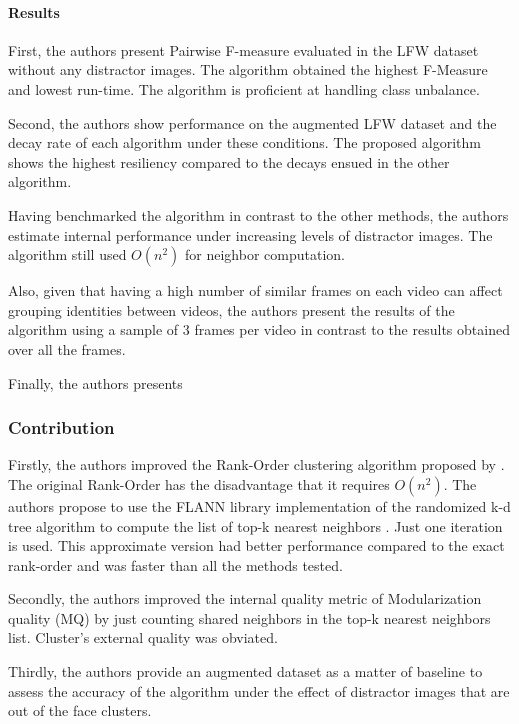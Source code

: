 \documentclass[17pt,]{extarticle}
\let\oldparagraph\paragraph
\renewcommand{\paragraph}[1]{\oldparagraph{#1}\mbox{}}
\begin{document}
\normalsize

\hypertarget{results}{%
\paragraph{Results}\label{results}}

First, the authors present Pairwise F-measure evaluated in the LFW dataset without any distractor images. The algorithm obtained the highest F-Measure and lowest run-time. The algorithm is proficient at handling class unbalance.

Second, the authors show performance on the augmented LFW dataset and the decay rate of each algorithm under these conditions. The proposed algorithm shows the highest resiliency compared to the decays ensued in the other algorithm.

Having benchmarked the algorithm in contrast to the other methods, the authors estimate internal performance under increasing levels of distractor images. The algorithm still used \(O(n^2)\) for neighbor computation.

Also, given that having a high number of similar frames on each video can affect grouping identities between videos, the authors present the results of the algorithm using a sample of 3 frames per video in contrast to the results obtained over all the frames.

Finally, the authors presents

\hypertarget{contribution}{%
\subsubsection{Contribution}\label{contribution}}

Firstly, the authors improved the Rank-Order clustering algorithm proposed by \autocite{zhu2011}. The original Rank-Order has the disadvantage that it requires \(O(n^2)\). The authors propose to use the FLANN library implementation of the randomized k-d tree algorithm to compute the list of top-k nearest neighbors \autocite{hartley2008}. Just one iteration is used. This approximate version had better performance compared to the exact rank-order and was faster than all the methods tested.

Secondly, the authors improved the internal quality metric of Modularization quality (MQ) \autocite{mancoridis1998} by just counting shared neighbors in the top-k nearest neighbors list. Cluster's external quality was obviated.

Thirdly, the authors provide an augmented dataset as a matter of baseline to assess the accuracy of the algorithm under the effect of distractor images that are out of the face clusters.
\end{document}
